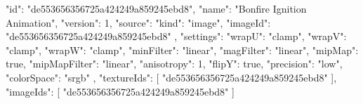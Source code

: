 {
  "id": "de553656356725a424249a859245ebd8",
  "name": "Bonfire Ignition Animation",
  "version": 1,
  "source": {
    "kind": "image",
    "imageId": "de553656356725a424249a859245ebd8"
  },
  "settings": {
    "wrapU": "clamp",
    "wrapV": "clamp",
    "wrapW": "clamp",
    "minFilter": "linear",
    "magFilter": "linear",
    "mipMap": true,
    "mipMapFilter": "linear",
    "anisotropy": 1,
    "flipY": true,
    "precision": "low",
    "colorSpace": "srgb"
  },
  "textureIds": [
    "de553656356725a424249a859245ebd8"
  ],
  "imageIds": [
    "de553656356725a424249a859245ebd8"
  ]
}
